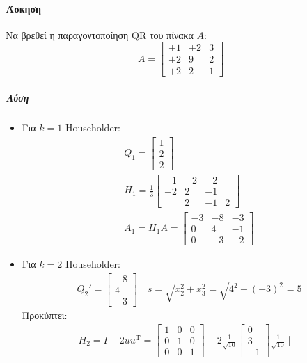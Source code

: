 \documentclass[11pt,a4paper,notitlepage,fleqn]{article}
\begin{document}
\paragraph{Άσκηση}
Να βρεθεί η παραγοντοποίηση QR του πίνακα \( A \):
\[
A = \left[\begin{matrix}
+1&+2&3\\+2&9&2\\+2&2&1
\end{matrix}\right]
\]
\subparagraph{Λύση}
\begin{itemize}
	\item Για \( k=1 \) Householder:
	\begin{gather*}
		Q_1 = \left[\begin{matrix}
		1\\2\\2
		\end{matrix}\right] \\
		H_1 = \frac{1}{3} \left[\begin{matrix}
		-1&-2&-2\\-2&2&-1\\&2&-1&2
		\end{matrix}\right] \\
		A_1 = H_1A = \left[\begin{matrix}
		-3 & -8 & -3 \\ 0 &4 & -1 \\ 0 & -3 & -2
		\end{matrix}\right]
	\end{gather*}
	\item Για \( k=2 \) Householder:
	\begin{gather*}
		Q_2' = \left[\begin{matrix}
		-8 \\ 4 \\ -3
		\end{matrix}\right] \quad s=\sqrt{x_2^2+x_3^2}=
		\sqrt{4^2+(-3)^2}=5
	\end{gather*}
	Προκύπτει:
	\begin{gather*}
		H_2 = I-2uu^{\mathrm T} = \left[\begin{matrix}
		1 & 0 & 0 \\ 0 & 1 & 0 \\ 0 & 0 & 1
		\end{matrix}\right] -2\frac{1}{\sqrt{10}} \left[\begin{matrix}
		0\\3\\-1
		\end{matrix}\right]\frac{1}{\sqrt{10}}\left[\begin{matrix}

\end{matrix}
\end{gather*}
\end{itemize}
\end{document}
